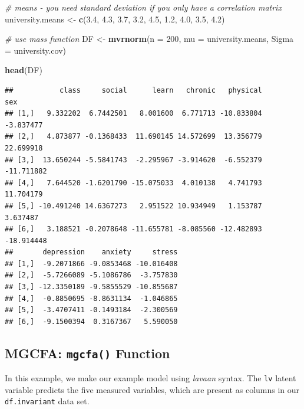 \documentclass[
  man,floatsintext]{apa7}
\newenvironment{Shaded}{\begin{snugshade}}{\end{snugshade}}
\newcommand{\AttributeTok}[1]{\textcolor[rgb]{0.13,0.29,0.53}{#1}}
\newcommand{\CommentTok}[1]{\textcolor[rgb]{0.56,0.35,0.01}{\textit{#1}}}
\newcommand{\DecValTok}[1]{\textcolor[rgb]{0.00,0.00,0.81}{#1}}
\newcommand{\FloatTok}[1]{\textcolor[rgb]{0.00,0.00,0.81}{#1}}
\newcommand{\FunctionTok}[1]{\textcolor[rgb]{0.13,0.29,0.53}{\textbf{#1}}}
\newcommand{\NormalTok}[1]{#1}
\newcommand{\OtherTok}[1]{\textcolor[rgb]{0.56,0.35,0.01}{#1}}
\begin{document}
\begin{Shaded}
\begin{Highlighting}[]
\CommentTok{\# means {-} you need standard deviation if you only have a correlation matrix }
\NormalTok{university.means }\OtherTok{\textless{}{-}} \FunctionTok{c}\NormalTok{(}\FloatTok{3.4}\NormalTok{, }\FloatTok{4.3}\NormalTok{, }\FloatTok{3.7}\NormalTok{, }\FloatTok{3.2}\NormalTok{, }\FloatTok{4.5}\NormalTok{, }\FloatTok{1.2}\NormalTok{, }\FloatTok{4.0}\NormalTok{, }\FloatTok{3.5}\NormalTok{, }\FloatTok{4.2}\NormalTok{)}

\CommentTok{\# use mass function}
\NormalTok{DF }\OtherTok{\textless{}{-}} \FunctionTok{mvrnorm}\NormalTok{(}\AttributeTok{n =} \DecValTok{200}\NormalTok{, }\AttributeTok{mu =}\NormalTok{ university.means, }\AttributeTok{Sigma =}\NormalTok{ university.cov)}

\FunctionTok{head}\NormalTok{(DF)}
\end{Highlighting}
\end{Shaded}

\normalsize

\begin{verbatim}
##           class     social      learn   chronic   physical        sex
## [1,]   9.332202  6.7442501   8.001600  6.771713 -10.833804  -3.837477
## [2,]   4.873877 -0.1368433  11.690145 14.572699  13.356779  22.699918
## [3,]  13.650244 -5.5841743  -2.295967 -3.914620  -6.552379 -11.711882
## [4,]   7.644520 -1.6201790 -15.075033  4.010138   4.741793  11.704179
## [5,] -10.491240 14.6367273   2.951522 10.934949   1.153787   3.637487
## [6,]   3.188521 -0.2078648 -11.655781 -8.085560 -12.482893 -18.914448
##       depression    anxiety     stress
## [1,]  -9.2071866 -9.0853468 -10.016408
## [2,]  -5.7266089 -5.1086786  -3.757830
## [3,] -12.3350189 -9.5855529 -10.855687
## [4,]  -0.8850695 -8.8631134  -1.046865
## [5,]  -3.4707411 -0.1493184  -2.300569
## [6,]  -9.1500394  0.3167367   5.590050
\end{verbatim}

\newpage

\subsection{\texorpdfstring{MGCFA: \texttt{mgcfa()} Function}{MGCFA: mgcfa() Function}}\label{mgcfa-mgcfa-function-1}

In this example, we make our example model using \emph{lavaan} syntax. The \texttt{lv} latent variable predicts the five measured variables, which are present as columns in our \texttt{df.invariant} data set.
\end{document}

